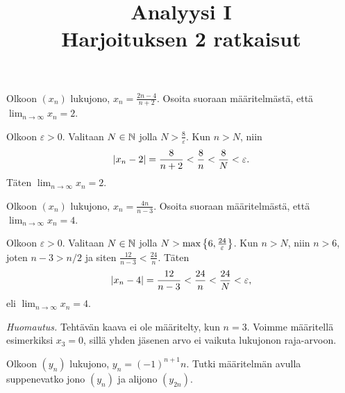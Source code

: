 \documentclass[11pt,a4paper]{amsart}
\title{Analyysi I\\Harjoituksen 2 ratkaisut}
\author{}
\date{}
\begin{document}

\begin{exercise}
  Olkoon \((x_n)\) lukujono, \(x_n = \frac{2n - 4}{n + 2}\). Osoita suoraan
  määritelmästä, että \(\lim_{n \to \infty} x_n = 2\).
\end{exercise}

\begin{solution}
  Olkoon \(\varepsilon > 0\). Valitaan \(N \in \mathbb{N}\) jolla \(N >
  \frac{8}{\varepsilon}\). Kun \(n > N\), niin
  \[
    \lvert x_n - 2\rvert = \frac{8}{n + 2} < \frac{8}{n} < \frac{8}{N} < \varepsilon.
  \]
  Täten \(\lim_{n \to \infty} x_n = 2\).
\end{solution}

\begin{exercise}
  Olkoon \((x_n)\) lukujono, \(x_n = \frac{4n}{n - 3}\). Osoita suoraan
  määritelmästä, että \(\lim_{n \to \infty} x_n = 4\).
\end{exercise}

\begin{solution}
  Olkoon \(\varepsilon > 0\). Valitaan \(N \in \mathbb{N}\) jolla \(N >
  \max\left\lbrace6, \frac{24}{\varepsilon}\right\rbrace\). Kun \(n > N\), niin \(n > 6\),
  joten \(n - 3 > n/2\) ja siten
  \(\frac{12}{n - 3} < \frac{24}{n}\). Täten
  \[
    \lvert x_n - 4\rvert = \frac{12}{n - 3} < \frac{24}{n} < \frac{24}{N}
    < \varepsilon,
  \]
  eli \(\lim_{n \to \infty} x_n = 4\).

  \smallskip
  \noindent\textit{Huomautus.} Tehtävän kaava ei ole määritelty, kun
  \(n = 3\). Voimme määritellä esimerkiksi \(x_3 = 0\), sillä yhden
  jäsenen arvo ei vaikuta lukujonon raja-arvoon.
\end{solution}

\begin{exercise}
  Olkoon \((y_n)\) lukujono, \(y_n = (-1)^{n + 1}n\). Tutki määritelmän
  avulla suppenevatko jono \((y_n)\) ja alijono \((y_{2n})\).
\end{exercise}
\end{document}
